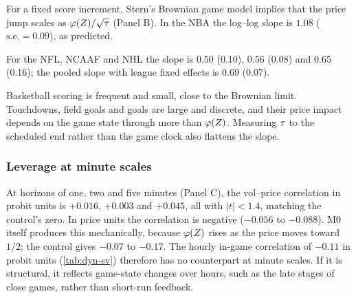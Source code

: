 For a fixed score increment, Stern's Brownian game model implies that the price jump scales as
$\varphi(Z)/\sqrt{\tau}$ (Panel B).
In the NBA the log--log slope is $1.08$ ($\text{s.e.}=0.09$), as predicted.

For the NFL, NCAAF and NHL the slope is 0.50 (0.10), 0.56 (0.08) and 0.65 (0.16); the
  pooled slope with league fixed effects is 0.69 (0.07).

Basketball scoring is frequent and small, close to the Brownian limit. Touchdowns, field goals and
goals are large and discrete, and their price impact depends on the game state through more than
$\varphi(Z)$. Measuring $\tau$ to the scheduled end rather than the game clock also flattens the
slope.

\subsubsection{Leverage at minute scales}\label{sec:dyn-res-hf-lev}

At horizons of one, two and five minutes (Panel C), the vol--price correlation in probit units is
$+0.016$, $+0.003$ and $+0.045$, all with $|t|<1.4$, matching the control's zero. In price units
the correlation is negative ($-0.056$ to $-0.088$). M0 itself produces this mechanically, because
$\varphi(Z)$ rises as the price moves toward $1/2$; the control gives $-0.07$ to $-0.17$. The
hourly in-game correlation of $-0.11$ in probit units (\cref{tab:dyn-sv}) therefore has no
counterpart at minute scales. If it is structural, it reflects game-state changes over hours, such
as the late stages of close games, rather than short-run feedback.

